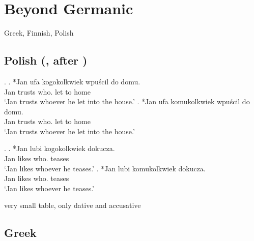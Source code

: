 
\chapter{Beyond Germanic}

Greek, Finnish, Polish

\section{Polish (\citealt[17]{himmelreich2017}, after \citealt{citko2013})}

\ex.
\ag. *Jan ufa kogokolkwiek wpu{\'s}cil do domu.\\
Jan trusts who. let to home\\
`Jan trusts whoever he let into the house.'
\bg. *Jan ufa komukolkwiek wpu{\'s}cil do domu.\\
Jan trusts who. let to home\\
`Jan trusts whoever he let into the house.'

\ex.
\ag. *Jan lubi kogokolkwiek dokucza.\\
Jan likes who. teases\\
`Jan likes whoever he teases.'
\bg. *Jan lubi komukolkwiek dokucza.\\
Jan likes who. teases\\
`Jan likes whoever he teases.'

very small table, only dative and accusative



\section{Greek}

